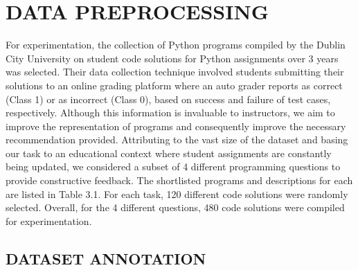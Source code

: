 
\chapter{DATA PREPROCESSING} %

For experimentation, the collection of Python programs compiled by the
Dublin City University \cite{A} on student code solutions for Python
assignments over 3 years was selected. Their data collection technique
involved students submitting their solutions to an online grading
platform where an auto grader reports as correct (Class 1) or as
incorrect (Class 0), based on success and failure of test cases,
respectively. Although this information is invaluable to instructors,
we aim to improve the representation of programs and consequently
improve the necessary recommendation provided. Attributing to the vast
size of the dataset and basing our task to an educational context
where student assignments are constantly being updated, we considered
a subset of 4 different programming questions to provide constructive
feedback. The shortlisted programs and descriptions for each are
listed in Table 3.1. For each task, 120 different code solutions were
randomly selected.  Overall, for the 4 different questions, 480 code
solutions were compiled for experimentation.

\begin{table}[H]
\caption{Questions and Description}
\centering
{}

\label{tab:ques}
\end{table}

\section{DATASET ANNOTATION}

